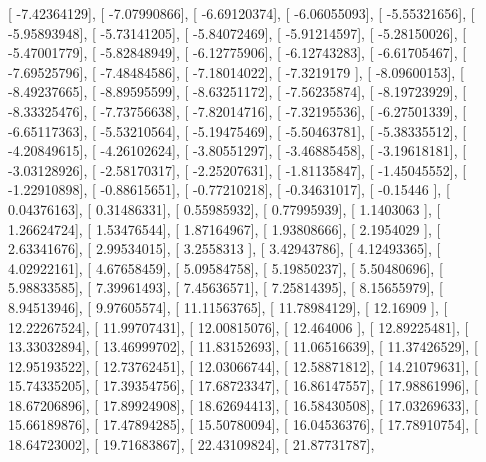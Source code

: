 \documentclass{article}
\begin{document}
       [ -7.42364129],
       [ -7.07990866],
       [ -6.69120374],
       [ -6.06055093],
       [ -5.55321656],
       [ -5.95893948],
       [ -5.73141205],
       [ -5.84072469],
       [ -5.91214597],
       [ -5.28150026],
       [ -5.47001779],
       [ -5.82848949],
       [ -6.12775906],
       [ -6.12743283],
       [ -6.61705467],
       [ -7.69525796],
       [ -7.48484586],
       [ -7.18014022],
       [ -7.3219179 ],
       [ -8.09600153],
       [ -8.49237665],
       [ -8.89595599],
       [ -8.63251172],
       [ -7.56235874],
       [ -8.19723929],
       [ -8.33325476],
       [ -7.73756638],
       [ -7.82014716],
       [ -7.32195536],
       [ -6.27501339],
       [ -6.65117363],
       [ -5.53210564],
       [ -5.19475469],
       [ -5.50463781],
       [ -5.38335512],
       [ -4.20849615],
       [ -4.26102624],
       [ -3.80551297],
       [ -3.46885458],
       [ -3.19618181],
       [ -3.03128926],
       [ -2.58170317],
       [ -2.25207631],
       [ -1.81135847],
       [ -1.45045552],
       [ -1.22910898],
       [ -0.88615651],
       [ -0.77210218],
       [ -0.34631017],
       [ -0.15446   ],
       [  0.04376163],
       [  0.31486331],
       [  0.55985932],
       [  0.77995939],
       [  1.1403063 ],
       [  1.26624724],
       [  1.53476544],
       [  1.87164967],
       [  1.93808666],
       [  2.1954029 ],
       [  2.63341676],
       [  2.99534015],
       [  3.2558313 ],
       [  3.42943786],
       [  4.12493365],
       [  4.02922161],
       [  4.67658459],
       [  5.09584758],
       [  5.19850237],
       [  5.50480696],
       [  5.98833585],
       [  7.39961493],
       [  7.45636571],
       [  7.25814395],
       [  8.15655979],
       [  8.94513946],
       [  9.97605574],
       [ 11.11563765],
       [ 11.78984129],
       [ 12.16909   ],
       [ 12.22267524],
       [ 11.99707431],
       [ 12.00815076],
       [ 12.464006  ],
       [ 12.89225481],
       [ 13.33032894],
       [ 13.46999702],
       [ 11.83152693],
       [ 11.06516639],
       [ 11.37426529],
       [ 12.95193522],
       [ 12.73762451],
       [ 12.03066744],
       [ 12.58871812],
       [ 14.21079631],
       [ 15.74335205],
       [ 17.39354756],
       [ 17.68723347],
       [ 16.86147557],
       [ 17.98861996],
       [ 18.67206896],
       [ 17.89924908],
       [ 18.62694413],
       [ 16.58430508],
       [ 17.03269633],
       [ 15.66189876],
       [ 17.47894285],
       [ 15.50780094],
       [ 16.04536376],
       [ 17.78910754],
       [ 18.64723002],
       [ 19.71683867],
       [ 22.43109824],
       [ 21.87731787],
\end{document}
